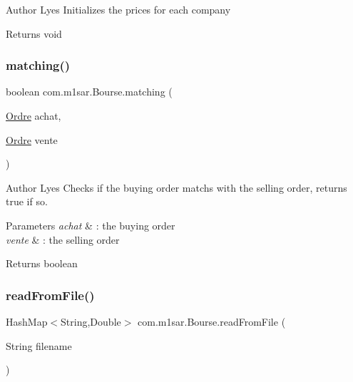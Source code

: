 \begin{DoxyAuthor}{Author}
Lyes Initializes the prices for each company 
\end{DoxyAuthor}
\begin{DoxyReturn}{Returns}
{\ttfamily void} 
\end{DoxyReturn}
\mbox{\label{classcom_1_1m1sar_1_1_bourse_a0bfccebb42e75ab2465b86ceb2ec9f68}} 
\subsubsection{\texorpdfstring{matching()}{matching()}}
{\footnotesize\ttfamily boolean com.\+m1sar.\+Bourse.\+matching (\begin{DoxyParamCaption}\item[{\hyperlink{classcom_1_1m1sar_1_1_ordre}{Ordre}}]{achat,  }\item[{\hyperlink{classcom_1_1m1sar_1_1_ordre}{Ordre}}]{vente }\end{DoxyParamCaption})}

\begin{DoxyAuthor}{Author}
Lyes Checks if the buying order matchs with the selling order, returns true if so. 
\end{DoxyAuthor}

\begin{DoxyParams}{Parameters}
{\em achat} & \+: the buying order \\
\hline
{\em vente} & \+: the selling order \\
\hline
\end{DoxyParams}
\begin{DoxyReturn}{Returns}
{\ttfamily boolean} 
\end{DoxyReturn}
\mbox{\label{classcom_1_1m1sar_1_1_bourse_a807d02571a2cfdfccb83b74549a3e208}} 
\subsubsection{\texorpdfstring{read\+From\+File()}{readFromFile()}}
{\footnotesize\ttfamily Hash\+Map$<$String,Double$>$ com.\+m1sar.\+Bourse.\+read\+From\+File (\begin{DoxyParamCaption}\item[{String}]{filename }\end{DoxyParamCaption})}

